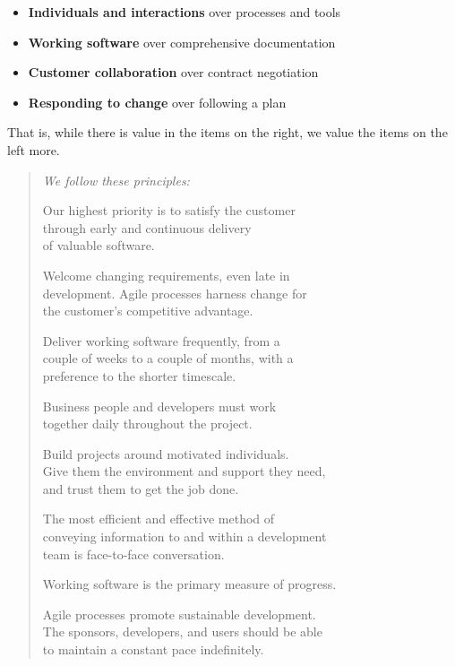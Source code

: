 \documentclass[10pt,twoside,openright]{memoir}
\begin{document}
\begin{itemize}
\item \textbf{Individuals and interactions} over processes and tools
\item \textbf{Working software} over comprehensive documentation
\item \textbf{Customer collaboration} over contract negotiation
\item \textbf{Responding to change} over following a plan
\end{itemize}
That is, while there is value in the items on
the right, we value the items on the left more.

\begin{verse}
\emph{We follow these principles:}

Our highest priority is to satisfy the customer \\
through early and continuous delivery \\
of valuable software.

Welcome changing requirements, even late in \\
development. Agile processes harness change for \\
the customer's competitive advantage.

Deliver working software frequently, from a \\
couple of weeks to a couple of months, with a \\
preference to the shorter timescale.

Business people and developers must work \\
together daily throughout the project.

Build projects around motivated individuals. \\
Give them the environment and support they need, \\
and trust them to get the job done.

The most efficient and effective method of \\
conveying information to and within a development \\
team is face-to-face conversation.

Working software is the primary measure of progress.

Agile processes promote sustainable development. \\
The sponsors, developers, and users should be able \\
to maintain a constant pace indefinitely.


\end{verse}
\end{document}
